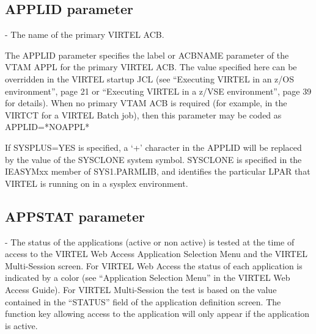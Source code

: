\documentclass[letterpaper,10pt,english]{sphinxmanual}
\begin{document}
\ignorespaces 

\subsection{APPLID parameter}
\label{\detokenize{Installation_Guide:index-35}}\label{\detokenize{Installation_Guide:id6}}
\begin{sphinxVerbatim}[commandchars=\\\{\}]
 
\end{sphinxVerbatim}

 - The name of the primary VIRTEL ACB.

The APPLID parameter specifies the label or ACBNAME parameter of the VTAM APPL for the primary VIRTEL ACB. The value specified here can be overridden in the VIRTEL startup JCL (see “Executing VIRTEL in an z/OS environment”, page 21 or “Executing VIRTEL in a z/VSE environment”, page 39 for details). When no primary VTAM ACB is required (for example, in the VIRTCT for a VIRTEL Batch job), then this parameter may be coded as APPLID=*NOAPPL*

If SYSPLUS=YES is specified, a ‘+’ character in the APPLID will be replaced by the value of the SYSCLONE system symbol. SYSCLONE is specified in the IEASYMxx member of SYS1.PARMLIB, and identifies the particular LPAR that VIRTEL is running on in a sysplex environment.

\ignorespaces 

\subsection{APPSTAT parameter}
\label{\detokenize{Installation_Guide:appstat-parameter}}\label{\detokenize{Installation_Guide:index-36}}
\begin{sphinxVerbatim}[commandchars=\\\{\}]
 
\end{sphinxVerbatim}

 - The status of the applications (active or non active) is tested at the time of access to the VIRTEL Web Access Application Selection Menu and the VIRTEL Multi-Session screen. For VIRTEL Web Access the status of each application is indicated by a color (see “Application Selection Menu” in the VIRTEL Web Access Guide). For VIRTEL Multi-Session the test is based on the value contained in the “STATUS” field of the application definition screen. The function key allowing access to the application will only appear if the application is active.
\end{document}
